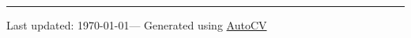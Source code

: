 \documentclass[10pt, letterpaper]{article}
\begin{document}


\hrule

























\vfill{}
\hrulefill

\begin{center}
{\footnotesize Last updated: \today — Generated using \href{https://github.com/poldrack/autoCV}{AutoCV} 
}
\end{center}
\end{document}
